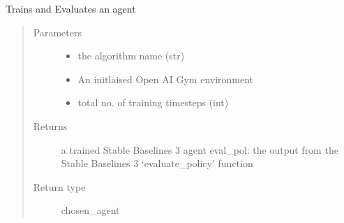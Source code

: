 \documentclass[letterpaper,10pt,english]{sphinxmanual}
\begin{document}
\begin{fulllineitems}
\label{\detokenize{source/yawning_titan.experiment_helpers:yawning_titan.experiment_helpers.sb3.train_and_eval}}
\sphinxAtStartPar
Trains and Evaluates an agent
\begin{quote}\begin{description}
\item[{Parameters}] \leavevmode\begin{itemize}
\item {}
\sphinxAtStartPar
{} \textendash{} the algorithm name (str)

\item {}
\sphinxAtStartPar
{} \textendash{} An initlaised Open AI Gym environment

\item {}
\sphinxAtStartPar
{} \textendash{} total no. of training timesteps (int)

\end{itemize}

\item[{Returns}] \leavevmode
\sphinxAtStartPar
a trained Stable Baselines 3 agent
eval\_pol: the output from the Stable Baselines 3 ‘evaluate\_policy’ function

\item[{Return type}] \leavevmode
\sphinxAtStartPar
chosen\_agent

\end{description}\end{quote}

\end{fulllineitems}
\end{document}
